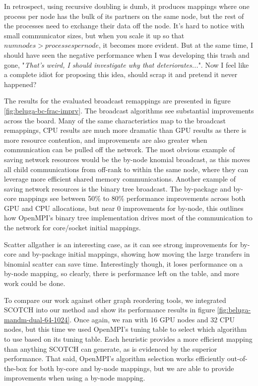 In retrospect, using recursive doubling is dumb, it produces mappings where one process per node has the bulk of its partners on the same node, but the rest of the processes need to exchange their data off the node. 
It's hard to notice with small communicator sizes, but when you scale it up so that $numnodes > processes per node$, it becomes more evident.
But at the same time, I should have seen the negative performance when I was developing this trash and gone, "\textit{That's weird, I should investigate why that deteriorates...}".
Now I feel like a complete idiot for proposing this idea, should scrap it and pretend it never happened?

The results for the evaluated broadcast remappings are presented in figure \ref{fig:beluga-bc-frac-imprv}.
The broadcast algorithms see substantial improvements across the board. 
Many of the same characteristics map to the broadcast remappings, CPU results are much more dramatic than GPU results as there is more resource contention, and improvements are also greater when communication can be pulled off the network. 
The most obvious example of saving network resources would be the by-node knomial broadcast, as this moves all child communications from off-rank to within the same node, where they can leverage more efficient shared memory communications. 
Another example of saving network resources is the binary tree broadcast.
The by-package and by-core mappings see between 50\% to 80\% performance improvements across both GPU and CPU allocations, but near 0 improvements for by-node, this outlines how OpenMPI's binary tree implementation drives most of the communication to the network for core/socket initial mappings. 

Scatter allgather is an interesting case, as it can see strong improvements for by-core and by-package initial mappings, showing how moving the large transfers in binomial scatter can save time. 
Interestingly though, it loses performance on a by-node mapping, so clearly, there is performance left on the table, and more work could be done.

To compare our work against other graph reordering tools, we integrated SCOTCH \cite{Pellegrini2012SCOTCH} into our method and show its performance results in figure \ref{fig:beluga-mandm-dual-64-1024}.
Once again, we ran with 16 GPU nodes and 32 CPU nodes, but this time we used OpenMPI's tuning table to select which algorithm to use based on its tuning table.
Each heuristic provides a more efficient mapping than anything SCOTCH can generate, as is evidenced by the superior performance. 
That said, OpenMPI's algorithm selection works efficiently out-of-the-box for both by-core and by-node mappings, but we are able to provide improvements when using a by-node mapping.  

